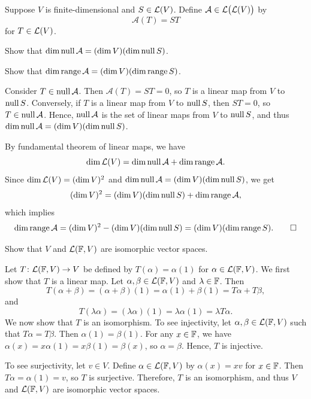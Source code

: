 \begin{exc}
\begin{exercise}
Suppose $V$ is finite-dimensional and $S\in\mathcal{L}(V)$. Define
$\mathcal{A}\in\mathcal{L}\bigl(\mathcal{L}(V)\bigr)$ by
\[ \mathcal{A}(T) = ST \]
for $T\in\mathcal{L}(V)$.
\begin{parts}
\item Show that $\operatorname{dim}\operatorname{null}\mathcal{A}=(\operatorname{dim} V)(\operatorname{dim}\operatorname{null} S)$.
\item Show that $\operatorname{dim}\operatorname{range}\mathcal{A}=(\operatorname{dim} V)(\operatorname{dim}\operatorname{range} S)$.
\end{parts}
\end{exercise}
\begin{solution}\leavevmode
\begin{parts}
\item Consider $T\in\operatorname{null}\mathcal{A}$. Then $\mathcal{A}(T)=ST=0$, so $T$ is a
  linear map from $V$ to $\operatorname{null} S$. Conversely, if $T$ is a linear map from $V$
  to $\operatorname{null} S$, then $ST=0$, so $T\in\operatorname{null}\mathcal{A}$. Hence, $\operatorname{null}\mathcal{A}$
  is the set of linear maps from $V$ to $\operatorname{null} S$, and thus
  $\operatorname{dim}\operatorname{null}\mathcal{A}=(\operatorname{dim} V)(\operatorname{dim}\operatorname{null} S)$.
\item By fundamental theorem of linear maps, we have
  \[ \operatorname{dim}\mathcal{L}(V) = \operatorname{dim}\operatorname{null}\mathcal{A}+\operatorname{dim}\operatorname{range}\mathcal{A}. \]
  Since $\operatorname{dim}\mathcal{L}(V)=(\operatorname{dim} V)^2$ and
  $\operatorname{dim}\operatorname{null}\mathcal{A}=(\operatorname{dim} V)(\operatorname{dim}\operatorname{null} S)$, we get
  \[ (\operatorname{dim} V)^2 = (\operatorname{dim} V)(\operatorname{dim}\operatorname{null} S)+\operatorname{dim}\operatorname{range}\mathcal{A}, \]
  which implies
  \[ \operatorname{dim}\operatorname{range}\mathcal{A} = (\operatorname{dim} V)^2-(\operatorname{dim} V)(\operatorname{dim}\operatorname{null} S)
     = (\operatorname{dim} V)(\operatorname{dim}\operatorname{range} S). \qedhere \]
\end{parts}
\end{solution}

\begin{exercise}
Show that $V$ and $\mathcal{L}(\mathbb{F},V)$ are isomorphic vector spaces.
\end{exercise}
\begin{solution}
Let $T\colon\mathcal{L}(\mathbb{F},V)\to V$ be defined by $T(\alpha)=\alpha(1)$ for
$\alpha\in\mathcal{L}(\mathbb{F},V)$. We first show that $T$ is a linear map. Let
$\alpha,\beta\in\mathcal{L}(\mathbb{F},V)$ and $\lambda\in\mathbb{F}$. Then
\[ T(\alpha+\beta) = (\alpha+\beta)(1) = \alpha(1)+\beta(1)
   = T\alpha+T\beta, \]
and
\[ T(\lambda\alpha) = (\lambda\alpha)(1) = \lambda\alpha(1) = \lambda T\alpha. \]
We now show that $T$ is an isomorphism. To see injectivity, let
$\alpha,\beta\in\mathcal{L}(\mathbb{F},V)$ such that $T\alpha=T\beta$. Then
$\alpha(1)=\beta(1)$. For any $x\in\mathbb{F}$, we have
$\alpha(x)=x\alpha(1)=x\beta(1)=\beta(x)$, so $\alpha=\beta$. Hence, $T$ is
injective.

To see surjectivity, let $v\in V$. Define $\alpha\in\mathcal{L}(\mathbb{F},V)$ by
$\alpha(x)=xv$ for $x\in\mathbb{F}$. Then $T\alpha=\alpha(1)=v$, so $T$ is surjective.
Therefore, $T$ is an isomorphism, and thus $V$ and $\mathcal{L}(\mathbb{F},V)$ are isomorphic
vector spaces.
\end{solution}


\end{exc}
